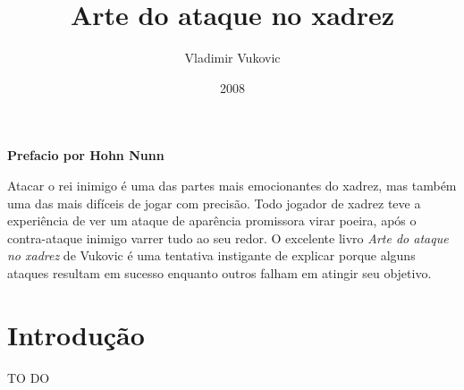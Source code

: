 \documentclass[12pt, openright]{book}
\newcommand{\prefacename}{Prefacio por Hohn Nunn}
\newenvironment{preface}{
		\vspace*{\stretch{2}}
		{\noindent \bfseries \Huge \prefacename}
		\begin{center}
			\thispagestyle{plain}
		\end{center}%
	}
	{\vspace*{\stretch{5}}}
\begin{document}
		\title{\textbf{Arte do ataque no xadrez}}
		\author{Vladimir Vukovic}
		\date{2008}
		\maketitle
		\pagestyle{empty}
		
	
		
		\shipout\null
		
		\frontmatter
		
		\begin{preface}
			Atacar o rei inimigo é uma das partes mais emocionantes do xadrez, mas também uma das mais difíceis de jogar com precisão. Todo jogador de xadrez teve a experiência de ver um ataque de aparência promissora virar poeira, após o contra-ataque inimigo varrer tudo ao seu redor. O excelente livro \textit{Arte do ataque no xadrez} de Vukovic é uma tentativa instigante de explicar porque alguns ataques resultam em sucesso enquanto outros falham em atingir seu objetivo.
		\end{preface}
		
		\clearpage
		
		\tableofcontents
		
	\clearpage
		
		\section{Introdução}
		 TO DO
		
		
		
		
		
		
		
	
\end{document}
